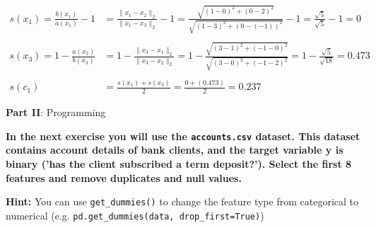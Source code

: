 \documentclass[12pt]{article}
\begin{document}
\begin{enumerate}
\begin{enumerate}[label=\alph*)]
        \begin{equation*}
            \begin{aligned}
                s(x_1) = \frac{b(x_1)}{a(x_1)} - 1 &= \frac{\|x_1-x_2\|_2}{\|x_1-x_3\|_2} - 1 = \frac{\sqrt{(1-0)^2+(0-2)^2}}{\sqrt{(1-3)^2+(0-(-1))^2}} - 1 = \frac{\sqrt{5}}{\sqrt{5}} - 1 = 0\\
                \\
                s(x_3) = 1 - \frac{a(x_3)}{b(x_3)} &= 1 - \frac{\|x_3-x_1\|_2}{\|x_3-x_2\|_2} = 1 - \frac{\sqrt{(3-1)^2+(-1-0)^2}}{\sqrt{(3-0)^2+(-1-2)^2}} = 1 - \frac{\sqrt{5}}{\sqrt{18}} = 0.473\\
                \\
                s(c_1) &= \frac{s(x_1) + s(x_3)}{2} = \frac{0+(0.473)}{2} = 0.237
            \end{aligned}
        \end{equation*}

    \end{enumerate}
\end{enumerate}

\vspace{20pt}
\large{\textbf{Part II}: Programming}\normalsize

\vspace{20pt}
\textbf{In the next exercise you will use the \texttt{accounts.csv} dataset. This dataset contains account details
of bank clients, and the target variable y is binary ('has the client subscribed a term deposit?'). Select the first 8 features and remove duplicates and null values.}

\vspace{10pt}
\textbf{Hint:} You can use \texttt{get\_dummies()} to change the feature type from categorical to numerical
    (e.g. \texttt{pd.get\_dummies(data, drop\_first=True)})
\end{document}
